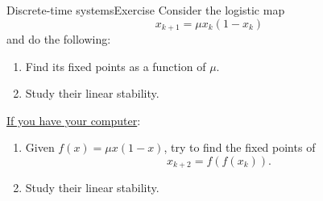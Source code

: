 \documentclass[usenames,dvipsnames,svgnames,10pt,aspectratio=169]{beamer}
\begin{document}
\begin{frame}[t, c]{Discrete-time systems}{Exercise}
	Consider the logistic map
	$$ x_{k+1} = \mu x_k ( 1 - x_k )$$
	and do the following:
	\begin{enumerate}
		\item Find its fixed points as a function of $\mu$.
		\item Study their linear stability.
	\end{enumerate}

	\bigskip

	\underline{If you have your computer}:
	\begin{enumerate}
		\item Given $f(x) = \mu x ( 1 - x )$, try to find the fixed points of
		$$x_{k+2} = f \left( f\left( x_k \right) \right).$$
		\item Study their linear stability.
	\end{enumerate}

	\vspace{1cm}
\end{frame}
\end{document}
